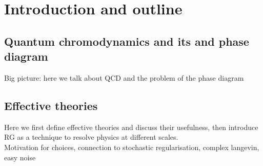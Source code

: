 \chapter{Introduction and outline}
\label{chap:introduction}

\section{Quantum chromodynamics and its and phase diagram}
Big picture: here we talk about QCD and the problem of the phase diagram
\section{Effective theories}
Here we first define effective theories and discuss their usefulness, then introduce RG as a technique to resolve physics at different scales. \\
\vspace{20pt}
Motivation for choices, connection to stochastic regularisation, complex langevin, easy noise \cite{boo}
